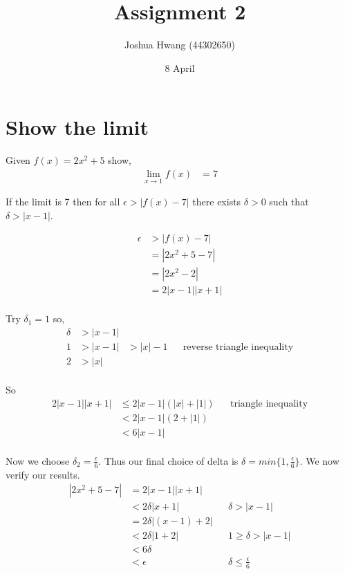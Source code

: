 \documentclass{article}
\title{Assignment 2}
\author{Joshua Hwang (44302650)}
\date{8 April}
\begin{document}
\maketitle
\section{Show the limit}
Given $f(x) = 2x^2 + 5$ show,
\begin{align*}
    \lim_{x \to 1} f(x) &= 7
\end{align*}

If the limit is 7 then for all $\epsilon > |f(x) - 7|$
there exists $\delta > 0$ such that $\delta > |x - 1|$.

\begin{align*}
    \epsilon &> |f(x) - 7| \\
    &= |2x^2 + 5 - 7| \\
    &= |2x^2 - 2| \\
    &= 2|x-1||x+1| \\
\end{align*}

Try $\delta_1 = 1$ so,
\begin{align*}
    \delta &> |x - 1| \\
    1 &> |x - 1| &> |x| - 1 && \text{reverse triangle inequality} \\
    2 &> |x| \\
\end{align*}

So 
\begin{align*}
    2|x-1||x+1| &\leq 2|x-1|(|x|+|1|) &&\text{triangle inequality} \\
    &< 2|x-1|(2+|1|) \\
    &< 6|x-1| \\
\end{align*}

Now we choose $\delta_2 = \frac{\epsilon}{6}$. Thus our final choice of delta
is $\delta = min\{1, \frac{\epsilon}{6}\}$. We now verify our results.
\begin{align*}
    |2x^2 + 5 - 7| &= 2|x-1||x+1| \\
    &< 2\delta|x+1| && \delta > |x-1| \\
    &= 2\delta|(x-1)+2| \\
    &< 2\delta|1+2| && 1 \geq \delta > |x-1| \\
    &< 6\delta \\
    &< \epsilon && \delta \leq \frac{\epsilon}{6}
\end{align*}
\end{document}
